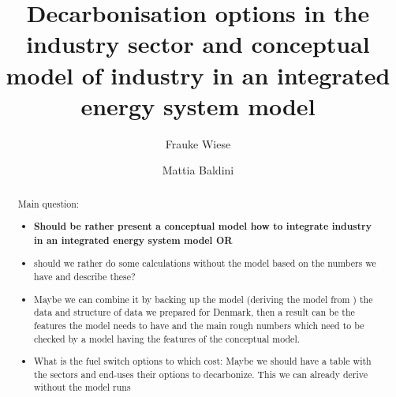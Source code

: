 \documentclass[review]{elsarticle}
\begin{document}
\begin{frontmatter}

\title{Decarbonisation options in the industry sector and conceptual model of industry in an integrated energy system model}


\author[mymainaddress]{Frauke Wiese}

\author[mymainaddress]{Mattia Baldini}

\address[mymainaddress]{DTU Management Engineering, Technical University of Denmark}

\begin{abstract}



Main question:
\begin{itemize}
    \item \textbf{Should be rather present a conceptual model how to integrate industry in an integrated energy system model OR} 
    \item should we rather do some calculations without the model based on the numbers we have and describe these?
    \item Maybe we can combine it by backing up the model (deriving the model from ) the data and structure of data we prepared for Denmark, then a result can be the features the model needs to have and the main rough numbers which need to be checked by a model having the features of the conceptual model.
    \item What is the fuel switch options to which cost: Maybe we should have a table with the sectors and end-uses their options to decarbonize. This we can already derive without the model runs
\end{itemize}


\end{abstract}
\end{frontmatter}
\end{document}
